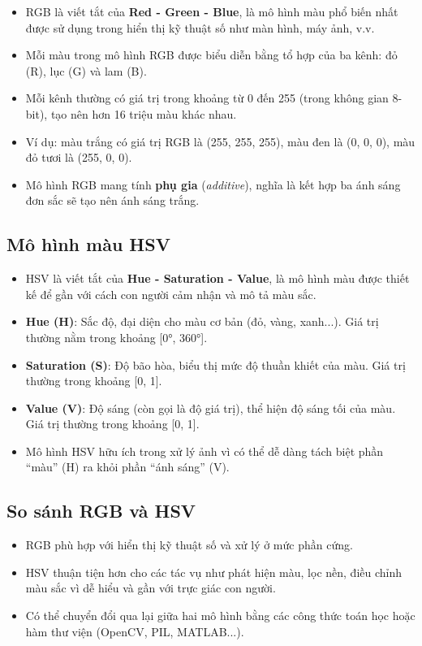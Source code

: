 \documentclass[12pt]{article}
\begin{document}
	\begin{itemize}
	\item RGB là viết tắt của \textbf{Red - Green - Blue}, là mô hình màu phổ biến nhất được sử dụng trong hiển thị kỹ thuật số như màn hình, máy ảnh, v.v.
	\item Mỗi màu trong mô hình RGB được biểu diễn bằng tổ hợp của ba kênh: đỏ (R), lục (G) và lam (B).
	\item Mỗi kênh thường có giá trị trong khoảng từ 0 đến 255 (trong không gian 8-bit), tạo nên hơn 16 triệu màu khác nhau.
	\item Ví dụ: màu trắng có giá trị RGB là (255, 255, 255), màu đen là (0, 0, 0), màu đỏ tươi là (255, 0, 0).
	\item Mô hình RGB mang tính \textbf{phụ gia} (\textit{additive}), nghĩa là kết hợp ba ánh sáng đơn sắc sẽ tạo nên ánh sáng trắng.
	\end{itemize}
	
	\subsection{Mô hình màu HSV}
	
	\begin{itemize}
	\item HSV là viết tắt của \textbf{Hue - Saturation - Value}, là mô hình màu được thiết kế để gần với cách con người cảm nhận và mô tả màu sắc.
	\item \textbf{Hue (H)}: Sắc độ, đại diện cho màu cơ bản (đỏ, vàng, xanh...). Giá trị thường nằm trong khoảng [0°, 360°].
	\item \textbf{Saturation (S)}: Độ bão hòa, biểu thị mức độ thuần khiết của màu. Giá trị thường trong khoảng [0, 1].
	\item \textbf{Value (V)}: Độ sáng (còn gọi là độ giá trị), thể hiện độ sáng tối của màu. Giá trị thường trong khoảng [0, 1].
	\item Mô hình HSV hữu ích trong xử lý ảnh vì có thể dễ dàng tách biệt phần “màu” (H) ra khỏi phần “ánh sáng” (V).
	\end{itemize}
	
	\subsection{So sánh RGB và HSV}
	
	\begin{itemize}
	\item RGB phù hợp với hiển thị kỹ thuật số và xử lý ở mức phần cứng.
	\item HSV thuận tiện hơn cho các tác vụ như phát hiện màu, lọc nền, điều chỉnh màu sắc vì dễ hiểu và gần với trực giác con người.
	\item Có thể chuyển đổi qua lại giữa hai mô hình bằng các công thức toán học hoặc hàm thư viện (OpenCV, PIL, MATLAB...).
	\end{itemize}
	
\end{document}
